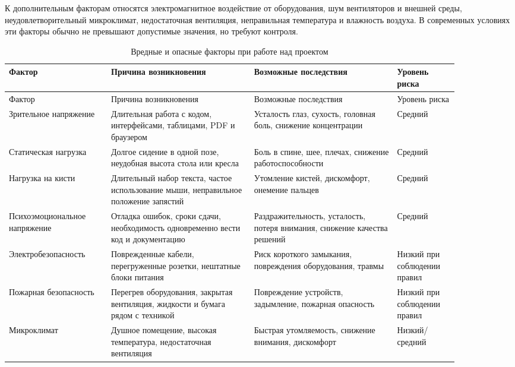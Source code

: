 К дополнительным факторам относятся электромагнитное воздействие от оборудования, шум вентиляторов и внешней среды, неудовлетворительный микроклимат, недостаточная вентиляция, неправильная температура и влажность воздуха. В современных условиях эти факторы обычно не превышают допустимые значения, но требуют контроля.


\noindent\scriptsize
\setlength{\tabcolsep}{3pt}
\renewcommand{\arraystretch}{1.18}
\begin{longtable}{|>{\RaggedRight\arraybackslash}p{0.20\linewidth}|>{\RaggedRight\arraybackslash}p{0.28\linewidth}|>{\RaggedRight\arraybackslash}p{0.28\linewidth}|>{\RaggedRight\arraybackslash}p{0.12\linewidth}|}
\caption{Вредные и опасные факторы при работе над проектом}\label{tab:3-1}\\
\hline
Фактор & Причина возникновения & Возможные последствия & Уровень риска\\ \hline
\endfirsthead
\hline
Фактор & Причина возникновения & Возможные последствия & Уровень риска\\ \hline
\endhead
Зрительное напряжение & Длительная работа с кодом, интерфейсами, таблицами, PDF и браузером & Усталость глаз, сухость, головная боль, снижение концентрации & Средний\\ \hline
Статическая нагрузка & Долгое сидение в одной позе, неудобная высота стола или кресла & Боль в спине, шее, плечах, снижение работоспособности & Средний\\ \hline
Нагрузка на кисти & Длительный набор текста, частое использование мыши, неправильное положение запястий & Утомление кистей, дискомфорт, онемение пальцев & Средний\\ \hline
Психоэмоциональное напряжение & Отладка ошибок, сроки сдачи, необходимость одновременно вести код и документацию & Раздражительность, усталость, потеря внимания, снижение качества решений & Средний\\ \hline
Электробезопасность & Поврежденные кабели, перегруженные розетки, нештатные блоки питания & Риск короткого замыкания, повреждения оборудования, травмы & Низкий при соблюдении правил\\ \hline
Пожарная безопасность & Перегрев оборудования, закрытая вентиляция, жидкости и бумага рядом с техникой & Повреждение устройств, задымление, пожарная опасность & Низкий при соблюдении правил\\ \hline
Микроклимат & Душное помещение, высокая температура, недостаточная вентиляция & Быстрая утомляемость, снижение внимания, дискомфорт & Низкий/средний\\ \hline
\end{longtable}
\normalsize



